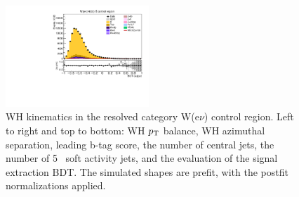 \begin{figure}[tbp]
\begin{center}
    \includegraphics[width=0.48\textwidth]{figures/wlnhbb2016/resolved/WenWH2TopCR_bdtValue.pdf}
    \caption{WH kinematics in the resolved category W(e$\nu$) \ttbar control region.
    Left to right and top to bottom: WH $p_{\mathrm{T}}$ balance, WH azimuthal separation, leading b-tag score, the number of central jets,
    the number of 5 \GeV\ soft activity jets, and the evaluation of the signal extraction BDT.
    The simulated shapes are prefit, with the postfit normalizations applied.}
    \label{fig:res_WenTT_WH}
  \end{center}
\end{figure}
\clearpage


